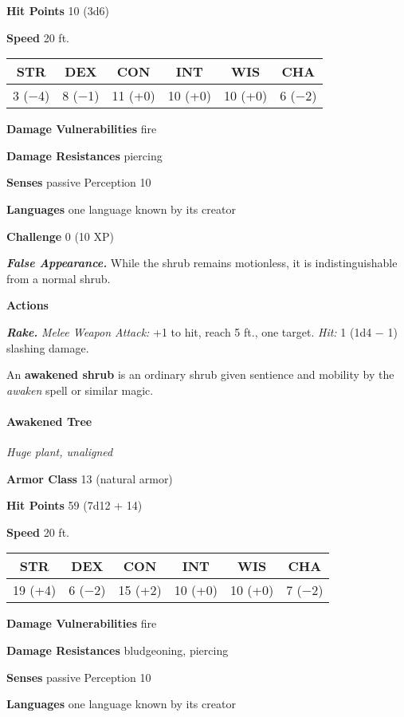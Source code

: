\documentclass[
]{article}
\begin{document}
\textbf{Hit Points} 10 (3d6)

\textbf{Speed} 20 ft.

\begin{longtable}[]{@{}cccccc@{}}
\toprule
STR & DEX & CON & INT & WIS & CHA\tabularnewline
\midrule
\endhead
3 (−4) & 8 (−1) & 11 (+0) & 10 (+0) & 10 (+0) & 6 (−2)\tabularnewline
\bottomrule
\end{longtable}

\textbf{Damage Vulnerabilities} fire

\textbf{Damage Resistances} piercing

\textbf{Senses} passive Perception 10

\textbf{Languages} one language known by its creator

\textbf{Challenge} 0 (10 XP)

\emph{\textbf{False Appearance.}} While the shrub remains motionless, it
is indistinguishable from a normal shrub.

\textbf{Actions}

\emph{\textbf{Rake.}} \emph{Melee Weapon Attack:} +1 to hit, reach 5
ft., one target. \emph{Hit:} 1 (1d4 − 1) slashing damage.

An \textbf{awakened shrub} is an ordinary shrub given sentience and
mobility by the \emph{awaken} spell or similar magic.

\hypertarget{awakened-tree}{%
\paragraph{Awakened Tree}\label{awakened-tree}}

\emph{Huge plant, unaligned}

\textbf{Armor Class} 13 (natural armor)

\textbf{Hit Points} 59 (7d12 + 14)

\textbf{Speed} 20 ft.

\begin{longtable}[]{@{}cccccc@{}}
\toprule
STR & DEX & CON & INT & WIS & CHA\tabularnewline
\midrule
\endhead
19 (+4) & 6 (−2) & 15 (+2) & 10 (+0) & 10 (+0) & 7 (−2)\tabularnewline
\bottomrule
\end{longtable}

\textbf{Damage Vulnerabilities} fire

\textbf{Damage Resistances} bludgeoning, piercing

\textbf{Senses} passive Perception 10

\textbf{Languages} one language known by its creator
\end{document}
